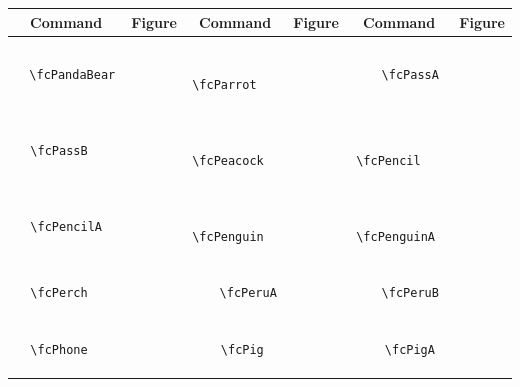 \documentclass[x11names]{article}
\begin{document}
\begin{table}[H]\centering\begin{tabular}{|c|c|c|c|c|c|}\hline{\bf Command} & {\bf Figure} & {\bf Command} & {\bf Figure} & {\bf Command} & {\bf Figure}\\	\hline	&\multirow{5}{*}{	\fcPandaBear	[scale=0.16]} & &\multirow{5}{*}{	\fcParrot	[scale=0.16]} & &\multirow{5}{*}{	\fcPassA	[scale=0.16]}\\	& & & & & \\	& & & & & \\	\verb|	\fcPandaBear	| & & \verb|	\fcParrot	| & & \verb|	\fcPassA	| & \\	& & & & & \\	& & & & & \\	& & & & & \\	\hline									
		&\multirow{5}{*}{	\fcPassB	[scale=0.16]} & &\multirow{5}{*}{	\fcPeacock	[scale=0.16]} & &\multirow{5}{*}{	\fcPencil	[scale=0.64]}\\	& & & & & \\	& & & & & \\	\verb|	\fcPassB	| & & \verb|	\fcPeacock	| & & \verb|	\fcPencil	| & \\	& & & & & \\	& & & & & \\	& & & & & \\	\hline									
		&\multirow{5}{*}{	\fcPencilA	[scale=0.16]} & &\multirow{5}{*}{	\fcPenguin	[scale=0.16]} & &\multirow{5}{*}{	\fcPenguinA	[scale=0.16]}\\	& & & & & \\	& & & & & \\	\verb|	\fcPencilA	| & & \verb|	\fcPenguin	| & & \verb|	\fcPenguinA	| & \\	& & & & & \\	& & & & & \\	& & & & & \\	\hline									
		&\multirow{5}{*}{	\fcPerch	[scale=0.16]} & &\multirow{5}{*}{	\fcPeruA	[scale=0.16]} & &\multirow{5}{*}{	\fcPeruB	[scale=0.16]}\\	& & & & & \\	& & & & & \\	\verb|	\fcPerch	| & & \verb|	\fcPeruA	| & & \verb|	\fcPeruB	| & \\	& & & & & \\	& & & & & \\	& & & & & \\	\hline									
		&\multirow{5}{*}{	\fcPhone	[scale=0.64]} & &\multirow{5}{*}{	\fcPig	[scale=0.64]} & &\multirow{5}{*}{	\fcPigA	[scale=0.16]}\\	& & & & & \\	& & & & & \\	\verb|	\fcPhone	| & & \verb|	\fcPig	| & & \verb|	\fcPigA	| & \\	& & & & & \\	& & & & & \\	& & & & & \\	\hline									

\end{tabular}
\end{table}
\end{document}
